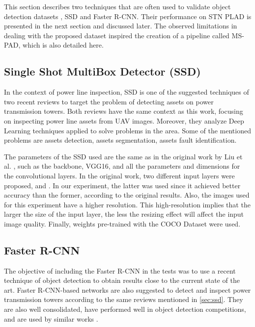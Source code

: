 \documentclass[10pt,conference]{IEEEtran}
\begin{document}
This section describes two techniques that are often used to validate object detection datasets \cite{tao2018cplid}, SSD and Faster R-CNN. Their performance on STN PLAD is presented in the next section and discussed later. The observed limitations in dealing with the proposed dataset inspired the creation of a pipeline called MS-PAD, which is also detailed here.

\subsection{Single Shot MultiBox Detector (SSD)}
\label{sec:ssd}

In the context of power line inspection, SSD is one of the suggested techniques of two recent reviews \cite{liu2020review, nguyen2018automatic} to target the problem of detecting assets on power transmission towers. Both reviews have the same context as this work, focusing on inspecting power line assets from UAV images. Moreover, they analyze Deep Learning techniques applied to solve problems in the area. Some of the mentioned problems are assets detection, assets segmentation, assets fault identification.

The parameters of the SSD used are the same as in the original work by Liu et al. \cite{liu2016ssd}, such as the backbone, VGG16, and all the parameters and dimensions for the convolutional layers. In the original work, two different input layers were proposed,  and . In our experiment, the latter was used since it achieved better accuracy than the former, according to the original results. Also, the images used for this experiment have a higher resolution. This high-resolution implies that the larger the size of the input layer, the less the resizing effect will affect the input image quality. Finally, weights pre-trained with the COCO Dataset \cite{lin2014microsoft} were used. 



\subsection{Faster R-CNN}
\label{sec:fasterrcnn}
The objective of including the Faster R-CNN \cite{ren2015faster} in the tests was to use a recent technique of object detection to obtain results close to the current state of the art. Faster R-CNN-based networks are also suggested to detect and inspect power transmission towers according to the same reviews mentioned in \autoref{sec:ssd}. They are also well consolidated, have performed well in object detection competitions, and are used by similar works \cite{liu2020review, nguyen2018automatic}. 
\end{document}
